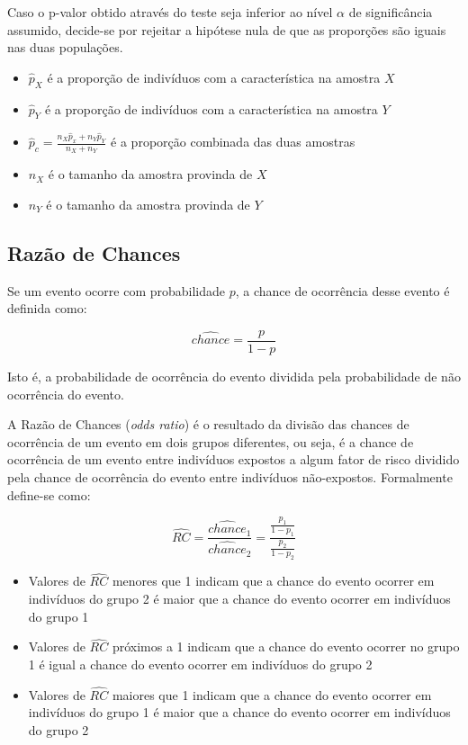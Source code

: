 \documentclass[
  portuguese,
]{estat/estat}
\providecommand{\tightlist}{%
  \setlength{\itemsep}{0pt}\setlength{\parskip}{0pt}}
\begin{document}
Caso o p-valor obtido através do teste seja inferior ao nível \(\alpha\)
de significância assumido, decide-se por rejeitar a hipótese nula de que
as proporções são iguais nas duas populações.

\begin{itemize}
\tightlist
\item
  \(\hat{p}_X\) é a proporção de indivíduos com a característica na
  amostra \(X\)
\item
  \(\hat{p}_Y\) é a proporção de indivíduos com a característica na
  amostra \(Y\)
\item
  \(\hat{p}_c=\frac{n_X\hat{p}_x+n_Y\hat{p}_Y}{n_X+n_Y}\) é a proporção
  combinada das duas amostras
\item
  \(n_X\) é o tamanho da amostra provinda de \(X\)
\item
  \(n_Y\) é o tamanho da amostra provinda de \(Y\)
\end{itemize}

\subsection{Razão de Chances}\label{razuxe3o-de-chances}

Se um evento ocorre com probabilidade \(p\), a chance de ocorrência
desse evento é definida como:

\[\hat{chance}=\frac{p}{1-p}\]

Isto é, a probabilidade de ocorrência do evento dividida pela
probabilidade de não ocorrência do evento.

A Razão de Chances (\textit{odds ratio}) é o resultado da divisão das
chances de ocorrência de um evento em dois grupos diferentes, ou seja, é
a chance de ocorrência de um evento entre indivíduos expostos a algum
fator de risco dividido pela chance de ocorrência do evento entre
indivíduos não-expostos. Formalmente define-se como:

\[\hat{RC}=\frac{\hat{chance}_1}{\hat{chance}_2}=\frac{\frac{p_1}{1-p_1}}{\frac{p_2}{1-p_2}}\]

\begin{itemize}
\item
  Valores de \(\hat{RC}\) menores que 1 indicam que a chance do evento
  ocorrer em indivíduos do grupo 2 é maior que a chance do evento
  ocorrer em indivíduos do grupo 1
\item
  Valores de \(\hat{RC}\) próximos a 1 indicam que a chance do evento
  ocorrer no grupo 1 é igual a chance do evento ocorrer em indivíduos do
  grupo 2
\item
  Valores de \(\hat{RC}\) maiores que 1 indicam que a chance do evento
  ocorrer em indivíduos do grupo 1 é maior que a chance do evento
  ocorrer em indivíduos do grupo 2
\end{itemize}
\end{document}
